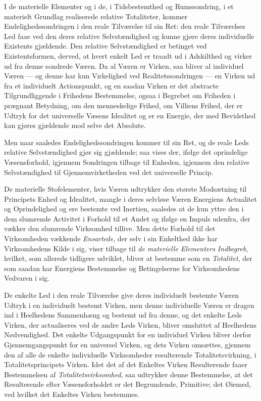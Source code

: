 I de materielle Elementer og i de, i Tidsbestemthed og Rumssondring, i et
materielt Grundlag realiserede relative Totaliteter, kommer
Endelighedssondringen i den reale Tilværelse til sin Ret: den reale
Tilværelses Led faae ved den deres relative Selvstændighed og kunne gjøre deres
individuelle Existents gjældende. Den relative Selvstændighed er betinget ved
Existentsformen, derved, at hvert enkelt Led er traadt ud i Adskilthed og
virker ud fra denne sondrede Væren. Da al Væren er Virken, saa bliver al
individuel Væren --- og denne har kun Virkelighed ved Realitetssondringen ---
en Virken ud fra et individuelt Actionspunkt, og en saadan Virken er det
abstracte Tilgrundliggende i
 Frihedens Bestemmelse, ogsaa i Begrebet om Friheden i prægnant Betydning, om
den menneskelige Frihed, om Villiens Frihed, der er Udtryk for det universelle
Væsens Idealitet og er en Energie, der med Bevidsthed kan gjøres gjældende mod
selve det Absolute.

Men naar saaledes Endelighedssondringen kommer til sin Ret, og de reale Leds
relative Selvstændighed gjør sig gjældende; saa vises der, ifølge det
oprindelige Væsensforhold, igjennem Sondringen tilbage til Enheden, igjennem
den relative Selvstændighed til Gjennemvirketheden ved det universelle Princip.

De materielle Stofelementer, hvis Væren udtrykker den største Modsætning til
Principets Enhed og Idealitet, mangle i deres selvløse Væren Energiens
Actualitet og Oprindelighed og ere bestemte ved Inertien, saaledes at de kun
yttre den i dem slumrende Activitet i Forhold til et Andet og ifølge en Impuls
udenfra, der vækker den slumrende Virksomhed tillive. Men dette Forhold til det
Virksomheden vækkende \emph{Ensartede}, der selv i sin Enkelthed ikke har
Virksomhedens Kilde i sig, viser tilbage til \emph{de materielle Elementers
Indbegreb}, hvilket, som allerede tidligere udviklet, bliver at bestemme som en
\emph{Totalitet}, der som saadan har Energiens Bestemmelse og Betingelserne for
Virksomhedens Vedvaren i sig.

De enkelte Led i den reale Tilværelse give deres individuelt bestemte Væren
Udtryk i en individuelt bestemt Virken, men denne individuelle Væren er dragen
ind i Heelhedens Sammenhæng og bestemt ud fra denne, og det enkelte Leds
Virken, der actualiseres ved de andre Leds Virken, bliver omsluttet af
Heelhedens Nødvendighed. Det enkelte Udgangspunkt for en individuel Virken
bliver derfor Gjennemgangspunkt for en universel Virken, og dets Virken
omsættes, gjennem den af alle de enkelte individuelle Virksomheder
resulterende Totalitetsvirkning, i Totalitetsprincipets Virken. Idet det af det
Enkeltes Virken Resulterende faaer Bestemmelsen af
\emph{Totalitetsvirksomhed}, saa udtrykker denne Bestemmelse, at det
Resulterende efter
 Væsensforholdet er det Begrundende, Primitive; det Øiemed, ved hvilket det
Enkeltes Virken bestemmes.

